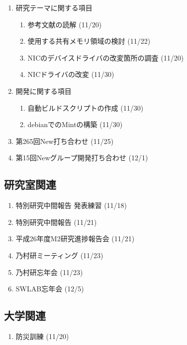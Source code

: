 \documentclass[fleqn, 14pt]{extarticle}
\begin{document}
\begin{enumerate}
\item 研究テーマに関する項目
\hfill
\begin{enumerate}


\item 参考文献の読解
\hfill
(11/20)

\item 使用する共有メモリ領域の検討
\hfill
(11/22)

\item NICのデバイスドライバの改変箇所の調査
\hfill
(11/20)

\item NICドライバの改変
\hfill
(11/30)

\end{enumerate}
\item 開発に関する項目
\hfill
\begin{enumerate}

\item 自動ビルドスクリプトの作成
\hfill
(11/30)

\item debianでのMintの構築
\hfill
(11/30)

\end{enumerate}
\item 第265回New打ち合わせ
\hfill
\label{enum-7}
(11/25)
\item 第15回Newグループ開発打ち合わせ
\hfill
\label{enum-8}
(12/1)
\end{enumerate}

\subsection{研究室関連}
\label{sec-4-2}

\begin{enumerate}


\item 特別研究中間報告 発表練習
\hfill
\label{enum-9}
(11/18)

\item 特別研究中間報告
\hfill
\label{enum-10}
(11/21)

\item 平成26年度M2研究進捗報告会
\hfill
\label{enum-11}
(11/21)


\item 乃村研ミーティング
\hfill
\label{enum-11}
(11/23)

\item 乃村研忘年会
\hfill
\label{enum-12}
(11/23)

\item SWLAB忘年会
\hfill
\label{enum-13}
(12/5)
\end{enumerate}

\subsection{大学関連}
\begin{enumerate}
\item 防災訓練
\hfill
\label{enum-13}
(11/20)
\end{enumerate}
\end{document}
